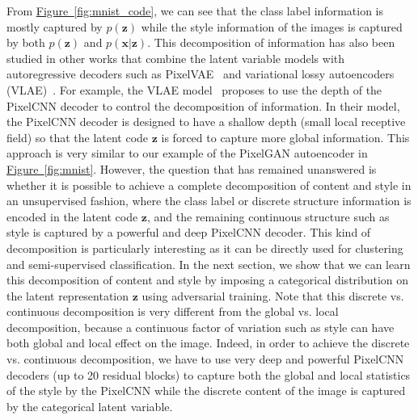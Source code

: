 \documentclass{article}
\newcommand{\myfig}[1]{\hyperref[fig:#1]{Figure~\ref*{fig:#1}}}
\begin{document}
From \myfig{mnist_code}, we can see that the class label information is mostly captured by $p(\mathbf{z})$ while the style information of the images is captured by both $p(\mathbf{z})$ and $p(\mathbf{x}|\mathbf{z})$. 
This decomposition of information has also been studied in other works that combine the latent variable models with autoregressive decoders such as PixelVAE~\citep{pixelvae} and variational lossy autoencoders (VLAE)~\citep{vlae}. For example, the VLAE model~\citep{vlae} proposes to use the depth of the PixelCNN decoder to control the decomposition of information. In their model, the PixelCNN decoder is designed to have a shallow depth (small local receptive field) so that the latent code $\mathbf{z}$ is forced to capture more global information. This approach is very similar to our example of the PixelGAN autoencoder in \myfig{mnist}. However, the question that has remained unanswered is whether it is possible to achieve a complete decomposition of content and style in an unsupervised fashion, where the class label or discrete structure information is encoded in the latent code $\mathbf{z}$, and the remaining continuous structure such as style is captured by a powerful and deep PixelCNN decoder. This kind of decomposition is particularly interesting as it can be directly used for clustering and semi-supervised classification. In the next section, we show that we can learn this decomposition of content and style by imposing a categorical distribution on the latent representation $\mathbf{z}$ using adversarial training. 
Note that this discrete vs. continuous decomposition is very different from the global vs. local decomposition, because a continuous factor of variation such as style can have both global and local effect on the image. 
Indeed, in order to achieve the  discrete vs. continuous decomposition, we have to use very deep and powerful PixelCNN decoders (up to 20 residual blocks) to capture both the global and local statistics of the style by the PixelCNN while the discrete content of the image is captured by the categorical latent variable.
\end{document}
